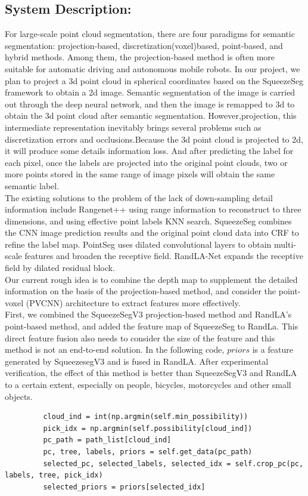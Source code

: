 \documentclass{article}
\begin{document}
\begin{normalsize}
    	\section{System Description:}
        
         For large-scale point cloud segmentation, there are four paradigms for semantic segmentation: projection-based, discretization(voxel)based, point-based, and hybrid methods. Among them, the projection-based method is often more suitable for automatic driving and autonomous mobile robots. In our project, we plan to project a 3d point cloud in spherical coordinates based on the SqueezeSeg framework to obtain a 2d image. Semantic segmentation of the image is carried out through the deep neural network, and then the image is remapped to 3d to obtain the 3d point cloud after semantic segmentation. However,projection, this intermediate representation inevitably brings several problems such as discretization errors and occlusions.Because the 3d point cloud is projected to 2d, it will produce some details information loss. And after predicting the label for each pixel, once the labels are projected into the original point clouds, two or more points stored in the same range of image pixels will obtain the same semantic label. \\
         The existing solutions to the problem of the lack of down-sampling detail information include Rangenet++ using range information to reconstruct to three dimensions, and using effective point labels KNN search. SqueezeSeg combines the CNN image prediction results and the original point cloud data into CRF to refine the label map. PointSeg uses dilated convolutional layers to obtain multi-scale features and broaden the receptive field. RandLA-Net expands the receptive field by dilated residual block.\\
         Our current rough idea is to combine the depth map to supplement the detailed information on the basis of the projection-based method, and consider the point-voxel (PVCNN) architecture to extract features more effectively. \\
         First, we combined the SqueezeSegV3 projection-based method and RandLA's\cite{Hu2019RandLA} point-based method, and added the feature map of SqueezeSeg to RandLa. This direct feature fusion also needs to consider the size of the feature and this method is not an end-to-end solution. In the following code, $priors$ is a feature generated by SqueezesegV3 and is fused in RandLA. After experimental verification, the effect of this method is better than SqueezeSegV3 and RandLA to a certain extent, especially on people, bicycles, motorcycles and other small objects.\\
         \begin{lstlisting}
         cloud_ind = int(np.argmin(self.min_possibility))
         pick_idx = np.argmin(self.possibility[cloud_ind])
         pc_path = path_list[cloud_ind]
         pc, tree, labels, priors = self.get_data(pc_path)
         selected_pc, selected_labels, selected_idx = self.crop_pc(pc, labels, tree, pick_idx)
         selected_priors = priors[selected_idx]
         

\end{lstlisting}
\end{normalsize}
\end{document}
